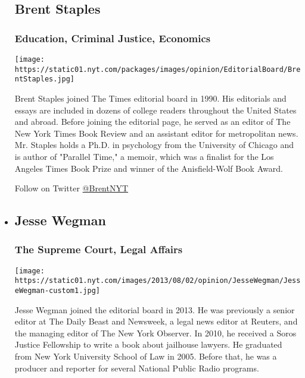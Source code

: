 \begin{itemize}
{  \subsection{Brent Staples}\label{brent-staples}}

  \hypertarget{education-criminal-justice-economics}{%
  \subsubsection{Education, Criminal Justice,
  Economics}\label{education-criminal-justice-economics}}

  \texttt{[image: https://static01.nyt.com/packages/images/opinion/EditorialBoard/BrentStaples.jpg]}

  Brent Staples joined The Times editorial board in 1990. His editorials
  and essays are included in dozens of college readers throughout the
  United States and abroad. Before joining the editorial page, he served
  as an editor of The New York Times Book Review and an assistant editor
  for metropolitan news. Mr. Staples holds a Ph.D. in psychology from
  the University of Chicago and is author of "Parallel Time," a memoir,
  which was a finalist for the Los Angeles Times Book Prize and winner
  of the Anisfield-Wolf Book Award.

  Follow on Twitter \href{http://twitter.com/BrentNYT}{@BrentNYT}
\item
  \hypertarget{jesse-wegman}{%
  \subsection{Jesse Wegman}\label{jesse-wegman}}

  \hypertarget{the-supreme-court-legal-affairs}{%
  \subsubsection{The Supreme Court, Legal
  Affairs}\label{the-supreme-court-legal-affairs}}

  \texttt{[image: https://static01.nyt.com/images/2013/08/02/opinion/JesseWegman/JesseWegman-custom1.jpg]}

  Jesse Wegman joined the editorial board in 2013. He was previously a
  senior editor at The Daily Beast and Newsweek, a legal news editor at
  Reuters, and the managing editor of The New York Observer. In 2010, he
  received a Soros Justice Fellowship to write a book about jailhouse
  lawyers. He graduated from New York University School of Law in 2005.
  Before that, he was a producer and reporter for several National
  Public Radio programs.


\end{itemize}
